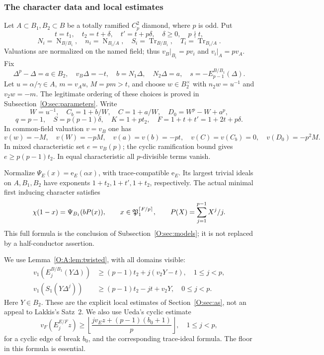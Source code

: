 \documentclass[11pt]{amsart}
\theoremstyle{definition}
\theoremstyle{remark}
\newcommand{\Tr}{\operatorname{Tr}}
\newcommand{\Nm}{\operatorname{N}}
\newcommand{\ceil}[1]{\left\lceil #1\right\rceil}
\newcommand{\floor}[1]{\left\lfloor #1\right\rfloor}
\newcommand{\ee}{\mathrm e}\newcommand{\echar}{\mathrm e}\newcommand{\FF}{\mathbf F}
\begin{document}
\subsubsection*{The character data and local estimates}
Let $A\subset B_1,B_2\subset B$ be a totally ramified $C_p^2$ diamond,
where $p$ is odd. Put
\[
 t=t_1,\quad t_2=t+\delta,\quad t'=t+p\delta,\quad
 \delta\ge0,\quad p\nmid t,
\]
\[
 N_i=\Nm_{B/B_i},\quad n_i=\Nm_{B_i/A},\quad
 S_i=\Tr_{B/B_i},\quad T_i=\Tr_{B_i/A}.
\]
Valuations are normalized on the named field; thus $v_B|_{B_i}=pv_i$
and $v_i|_A=pv_A$. Fix
\[
 \Delta^p-\Delta=a\in B_2,\quad v_B\Delta=-t,\quad
 b=N_1\Delta,\quad N_2\Delta=a,\quad
 s=-E_{p-1}^{B/B_1}(\Delta).
\]
Let $u=\alpha/\gamma\in A$, $m=v_Au$, $M=pm>t$, and choose
$w\in B_2^\times$ with $n_2w=u^{-1}$ and $v_2w=-m$.
The legitimate ordering of these choices is proved in Subsection~\ref{O:sec:parameters}.
Write
\[
 W=u^{-1},\quad C_b=1+b/W,\quad C=1+a/W,\quad
 D_0=W^p-W+a^p,
\]
\[
 q=p-1,\quad S=p(p-1)\delta,\quad K=1+pt_2,
 \quad F=1+t+t'=1+2t+p\delta.
\]
In common-field valuation $v=v_B$ one has
\[
 v(w)=-M,\quad v(W)=-pM,\quad v(a)=v(b)=-pt,
 \quad v(C)=v(C_b)=0,\quad v(D_0)=-p^2M.
\]
In mixed characteristic set $e=v_B(p)$; the cyclic ramification
bound gives $e\ge p(p-1)t_2$. In equal characteristic all
$p$-divisible terms vanish.

Normalize $\Psi_E(x)=\ee_E(\alpha x)$, with trace-compatible
$\ee_E$. Its largest trivial ideals on $A,B_1,B_2$ have exponents
$1+t_2,1+t',1+t_2$, respectively. The actual minimal first inducing
character satisfies
\begin{equation}\label{O:D:actual}
 \chi(1-x)=\Psi_{B_1}(bP(x)),\qquad
 x\in\PP_1^{\ceil{F/p}},\qquad
 P(X)=\sum_{j=1}^{p-1}X^j/j.
\end{equation}
This full formula is the conclusion of Subsection~\ref{O:sec:models}; it is not
replaced by a half-conductor assertion.

We use Lemma~\ref{O:A:lem:twisted}, with all domains visible:
\begin{align}
 v_1(E_j^{B/B_1}(Y\Delta))
   &\ge(p-1)t_2+j(v_2Y-t),\quad 1\le j<p,\label{O:D:H15s}\\
 v_1(S_1(Y\Delta^j))
   &\ge(p-1)t_2-jt+v_2Y,\quad 0\le j<p.\label{O:D:H15t}
\end{align}
Here $Y\in B_2$. These are the explicit local estimates of Section~\ref{O:sec:as},
not an appeal to Lakkis's Satz~2. We also use Ueda's cyclic estimate
\begin{equation}\label{O:D:cyclic}
 v_F(E_j^{E/F}z)\ge
 \floor{\frac{jv_Ez+(p-1)(b_0+1)}p},\quad 1\le j<p,
\end{equation}
for a cyclic edge of break $b_0$, and the corresponding trace-ideal
formula. The floor in this formula is essential.
\end{document}
